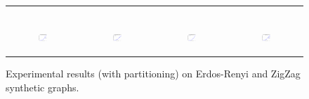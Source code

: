 \begin{figure}[ht]
\begin{tabular}{cccc}
\begin{subfigure}[b]{0.22\textwidth}
			\caption{}
			\label{appfig:partition:diffFA_CF2G_zigzag_setcover}
	  \end{subfigure} \\
	  \begin{subfigure}[b]{0.22\textwidth}
	  	\includegraphics[width=110pt]{images_partition/validated_CC2G_erdosrenyi_maxgraphcut.eps}
			\caption{}
			\label{appfig:partition:validated_CC2G_erdosrenyi_maxgraphcut}
	  \end{subfigure} &
	  \begin{subfigure}[b]{0.22\textwidth}
	  	\includegraphics[width=110pt]{images_partition/validated_CC2G_erdosrenyi_setcover.eps}
			\caption{}
			\label{appfig:partition:validated_CC2G_erdosrenyi_setcover}
	  \end{subfigure} &
	  \begin{subfigure}[b]{0.22\textwidth}
	  	\includegraphics[width=110pt]{images_partition/validated_CC2G_zigzag_maxgraphcut.eps}
			\caption{}
			\label{appfig:partition:validated_CC2G_zigzag_maxgraphcut}
	  \end{subfigure} &
	  \begin{subfigure}[b]{0.22\textwidth}
	  	\includegraphics[width=110pt]{images_partition/validated_CC2G_zigzag_setcover.eps}
			\caption{}
			\label{appfig:partition:validated_CC2G_zigzag_setcover}
	  \end{subfigure} \\
  \end{tabular}
  \caption{Experimental results (with partitioning) on Erdos-Renyi and ZigZag synthetic graphs.}
\end{figure}


